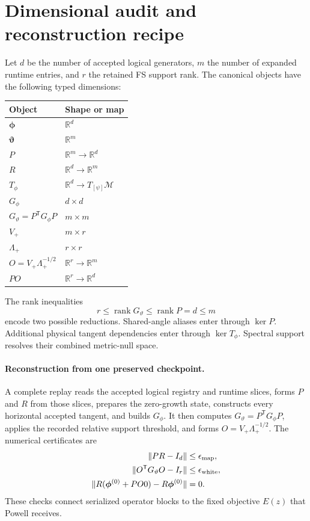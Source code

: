 \documentclass[10pt,twocolumn]{article}
\newcommand{\R}{\mathbb R}
\newcommand{\rank}{\operatorname{rank}}
\begin{document}
\section*{Dimensional audit and reconstruction recipe}

Let \(d\) be the number of accepted logical generators, \(m\) the number of
expanded runtime entries, and \(r\) the retained FS support rank. The canonical
objects have the following typed dimensions:
\begin{center}
\renewcommand{\arraystretch}{1.13}
\begin{tabular}{@{}ll@{}}
\toprule
Object & Shape or map \\
\midrule
\(\bm\phi\) & \(\R^d\) \\
\(\bm\vartheta\) & \(\R^m\) \\
\(P\) & \(\R^m\to\R^d\) \\
\(R\) & \(\R^d\to\R^m\) \\
\(T_\phi\) & \(\R^d\to T_{[\psi]}\mathcal M\) \\
\(G_\phi\) & \(d\times d\) \\
\(G_\vartheta=P^{\mathsf T}G_\phi P\) & \(m\times m\) \\
\(V_+\) & \(m\times r\) \\
\(\Lambda_+\) & \(r\times r\) \\
\(O=V_+\Lambda_+^{-1/2}\) & \(\R^r\to\R^m\) \\
\(PO\) & \(\R^r\to\R^d\) \\
\bottomrule
\end{tabular}
\end{center}
The rank inequalities
\begin{equation}
r\leq\rank G_\vartheta\leq\rank P=d\leq m
\label{eq:dimension-ranks}
\end{equation}
encode two possible reductions. Shared-angle aliases enter through
\(\ker P\). Additional physical tangent dependencies enter through
\(\ker T_\phi\). Spectral support resolves their combined metric-null space.

\paragraph{Reconstruction from one preserved checkpoint.}
A complete replay reads the accepted logical registry and runtime slices,
forms \(P\) and \(R\) from those slices, prepares the zero-growth state,
constructs every horizontal accepted tangent, and builds \(G_\phi\). It then
computes \(G_\vartheta=P^{\mathsf T}G_\phi P\), applies the recorded relative
support threshold, and forms \(O=V_+\Lambda_+^{-1/2}\). The numerical
certificates are
\begin{align}
\|PR-I_d\|&\leq\epsilon_{\rm map},\nonumber\\
\|O^{\mathsf T}G_\vartheta O-I_r\|
&\leq\epsilon_{\rm white},\nonumber\\
\|R(\bm\phi^{(0)}+PO0)-R\bm\phi^{(0)}\|&=0.
\label{eq:reconstruction-certificates}
\end{align}
These checks connect serialized operator blocks to the fixed objective
\(E(z)\) that Powell receives.
\end{document}
